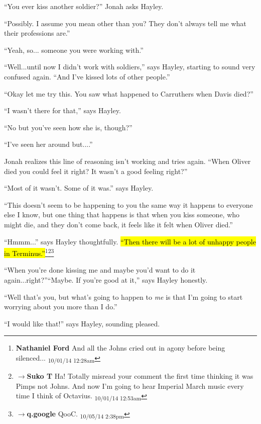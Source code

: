 ``You ever kiss another soldier?'' Jonah asks Hayley.

``Possibly.  I assume you mean other than you?  They don't always tell me what their professions are.''

``Yeah, so... someone you were working with.''

``Well...until now I didn't work with soldiers,'' says Hayley, starting to sound very confused again. ``And I've kissed lots of other people.''

``Okay let me try this.  You saw what happened to Carruthers when Davis died?''

``I wasn't there for that,'' says Hayley.

``No but you've seen how she is, though?''

``I've seen her around but....''

Jonah realizes this line of reasoning isn't working and tries again.  ``When Oliver died you could feel it right?  It wasn't a good feeling right?''

``Most of it wasn't.  Some of it was.'' says Hayley.

``This doesn't seem to be happening to you the same way it happens to everyone else I know, but one thing that happens is that when you kiss someone, who might die, and they don't come back, it feels like it felt when Oliver died.''

``Hmmm...'' says Hayley thoughtfully.  \hl{``Then there will be a lot of unhappy people in Terminus.''}\footnote{\textbf{Nathaniel Ford }And all the Johns cried out in agony before being silenced... \textsubscript{10/01/14 12:28am}}\footnote{$\rightarrow$\textbf{Suko T }Ha!  Totally misread your comment the first time thinking it was Pimps not Johns.  And now I'm going to hear Imperial March music every time I think of Octavius. \textsubscript{10/01/14 12:53am}}\footnote{$\rightarrow$\textbf{q.google }QooC. \textsubscript{10/05/14 2:38pm}}

``When you're done kissing me and maybe you'd want to do it again...right?''``Maybe.  If you're good at it,'' says Hayley honestly.

``Well that's you, but what's going to happen to \textit{me} is that I'm going to start worrying about you more than I do.''

``I would like that!'' says Hayley, sounding pleased.

